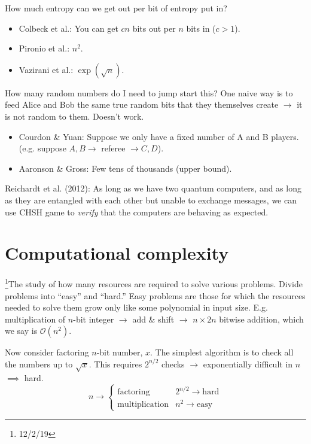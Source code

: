 \documentclass[12pt]{article}
\begin{document}
How much entropy can we get out per bit of entropy put in?
\begin{itemize}
    \item Colbeck et al.: You can get $cn$ bits out per $n$ bits in ($c
        > 1$).
    \item Pironio et al.: $n^2$.
    \item Vazirani et al.: $\exp(\sqrt{n})$.
\end{itemize}
How many random numbers do I need to jump start this? One naive way is
to feed Alice and Bob the same true random bits that they themselves
create $\rightarrow$ it is not random to them. Doesn't work.
\begin{itemize}
    \item Courdon \& Yuan: Suppose we only have a fixed number of A and
        B players. (e.g. suppose $A,B \rightarrow$ referee $\rightarrow
        C,D$).
    \item Aaronson \& Gross: Few tens of thousands (upper bound).
\end{itemize}
Reichardt et al. (2012): As long as we have two quantum computers, and as long
as they are entangled with each other but unable to exchange messages, we can
use CHSH game to \emph{verify} that the computers are behaving as expected.


\section{Computational complexity}
\footnote{12/2/19}The study of how many resources are required to solve various
problems. Divide problems into ``easy'' and ``hard.''  Easy problems are those
for which the resources needed to solve them grow only like some polynomial in
input size. E.g. multiplication of $n$-bit integer $\rightarrow$ add \& shift
$\rightarrow$ $n \times 2n$ bitwise addition, which we say is
$\mathcal{O}(n^2)$.

Now consider factoring $n$-bit number, $x$. The simplest algorithm is to check
all the numbers up to $\sqrt{x}$. This requires $2^{n/2}$ checks $\rightarrow$
exponentially difficult in $n$ $\implies$ hard.
\[n \rightarrow \begin{cases}
    \text{factoring} & 2^{n/2} \rightarrow \text{hard}\\
    \text{multiplication} & n^2 \rightarrow \text{easy}
\end{cases}\]
\end{document}

